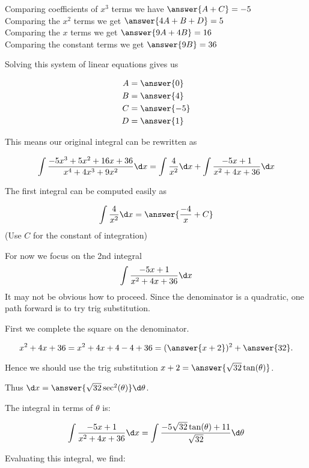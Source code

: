 \documentclass{ximera}
\begin{document}
\begin{exercise}
\begin{exercise}
\begin{exercise}
Comparing coefficients of $x^{3}$ terms we have $\answer{A+C}=-5$ \\
Comparing the $x^{2}$ terms we get $\answer {4A+B+D}=5$ \\
Comparing the $x$ terms we get $\answer{9A+4B}=16$ \\
Comparing the constant terms we get $\answer{9B}=36$ 

\begin{exercise}
Solving this system of linear equations gives us

\begin{align*}
A&=\answer{  0 }\\
B&=\answer{4   }\\
C&=\answer{  -5 }\\
D&=\answer{1    }
\end{align*}

\begin{exercise}
This means our original integral can be rewritten as 

\[
\int \frac{-5x^{3}+5x^{2}+16x+36}{x^{4}+4x^{3}+9x^{2}} \d x= \int \frac{4}{x^{2}} \d x + \int \frac{-5x+1}{x^{2}+4x+36} \d x 
\]

The first integral can be computed easily as

\[
\int \frac{4}{x^{2}} \d x=\answer{\frac{-4}{x}+C}
\]
(Use $C$ for the constant of integration)

\begin{exercise}

For now we focus on the 2nd integral 
\[
\int \frac{-5x+1}{x^{2}+4x+36} \d x 
\]
It may not be obvious how to proceed. Since the denominator is a quadratic, one path forward is to try trig substitution.

\begin{exercise}

First we complete the square on the denominator. 

\[
x^{2}+4x+36=x^{2}+4x+4-4+36=(\answer{x+2})^2+\answer{32}.
\]

Hence we should use the trig substitution $x+2=\answer{\sqrt{32}\tan(\theta)}$. 

Thus $\d x=\answer{ \sqrt{32} \sec^{2}(\theta)} \d \theta$. 

\begin{exercise}
The integral in terms of $\theta$ is:

\[
\int \frac{-5x+1}{x^{2}+4x+36} \d x =\int   \frac{-5\sqrt{32}\tan(\theta)+11}{\sqrt{32}}  \d \theta
\]

Evaluating this integral, we find:



\end{exercise}
\end{exercise}
\end{exercise}
\end{exercise}
\end{exercise}
\end{exercise}
\end{exercise}
\end{exercise}
\end{document}
